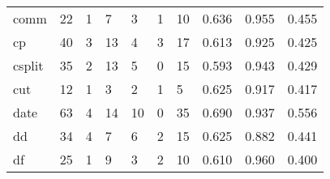 \begin{longtable}{lp{1.3cm}p{1.3cm}p{1.3cm}p{1.3cm}p{1.3cm}p{1.3cm}p{1.3cm}p{1.3cm}p{1.3cm}}
comm      &                     22 &                                             1 &                                            7 &                                           3 &                                            1 &                                         10 &                                0.636 &                                  0.955 &                                0.455 \\
cp        &                     40 &                                             3 &                                           13 &                                           4 &                                            3 &                                         17 &                                0.613 &                                  0.925 &                                0.425 \\
csplit    &                     35 &                                             2 &                                           13 &                                           5 &                                            0 &                                         15 &                                0.593 &                                  0.943 &                                0.429 \\
cut       &                     12 &                                             1 &                                            3 &                                           2 &                                            1 &                                          5 &                                0.625 &                                  0.917 &                                0.417 \\
date      &                     63 &                                             4 &                                           14 &                                          10 &                                            0 &                                         35 &                                0.690 &                                  0.937 &                                0.556 \\
dd        &                     34 &                                             4 &                                            7 &                                           6 &                                            2 &                                         15 &                                0.625 &                                  0.882 &                                0.441 \\
df        &                     25 &                                             1 &                                            9 &                                           3 &                                            2 &                                         10 &                                0.610 &                                  0.960 &                                0.400 \\

\end{longtable}
